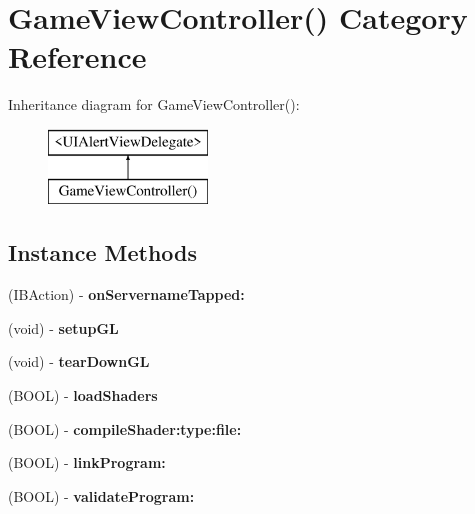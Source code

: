 \hypertarget{category_game_view_controller_07_08}{}\section{Game\+View\+Controller() Category Reference}
\label{category_game_view_controller_07_08}
Inheritance diagram for Game\+View\+Controller()\+:\begin{figure}[H]
\begin{center}
\leavevmode
\includegraphics[height=2.000000cm]{category_game_view_controller_07_08}
\end{center}
\end{figure}
\subsection*{Instance Methods}
\begin{DoxyCompactItemize}
\item 
\mbox{\label{category_game_view_controller_07_08_a8c2e8780241b616d585ba3cf8b75fda9}} 
(I\+B\+Action) -\/ {\bfseries on\+Servername\+Tapped\+:}
\item 
\mbox{\label{category_game_view_controller_07_08_a428d90a43c8732d980daa878bc0b796e}} 
(void) -\/ {\bfseries setup\+GL}
\item 
\mbox{\label{category_game_view_controller_07_08_a126aab10acd38763920483fed64068ce}} 
(void) -\/ {\bfseries tear\+Down\+GL}
\item 
\mbox{\label{category_game_view_controller_07_08_a3a3e225925b6ffef0ad04ba00770e20d}} 
(B\+O\+OL) -\/ {\bfseries load\+Shaders}
\item 
\mbox{\label{category_game_view_controller_07_08_a753a04fb7df9c783d211f7381aa98418}} 
(B\+O\+OL) -\/ {\bfseries compile\+Shader\+:type\+:file\+:}
\item 
\mbox{\label{category_game_view_controller_07_08_a9aeb1ddfc990b7190af8064146be56a8}} 
(B\+O\+OL) -\/ {\bfseries link\+Program\+:}
\item 
\mbox{\label{category_game_view_controller_07_08_a4daf7c5de6ad5f764ce9f603fff98f15}} 
(B\+O\+OL) -\/ {\bfseries validate\+Program\+:}
\end{DoxyCompactItemize}
